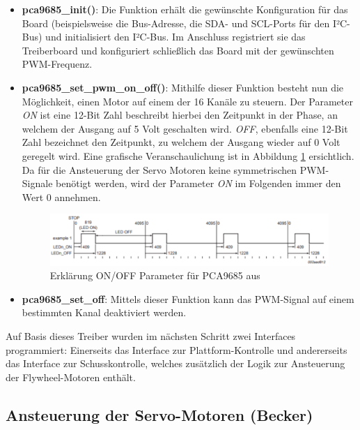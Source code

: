 \begin{itemize}
    \item \textbf{pca9685\_init()}: Die Funktion erhält die gewünschte Konfiguration für das Board (beispielsweise die Bus-Adresse, die SDA- und SCL-Ports für den I²C-Bus) und initialisiert den I²C-Bus. 
    Im Anschluss registriert sie das Treiberboard und konfiguriert schließlich das Board mit der gewünschten PWM-Frequenz.
    \item \textbf{pca9685\_set\_pwm\_on\_off()}: Mithilfe dieser Funktion besteht nun die Möglichkeit, einen Motor auf einem der 16 Kanäle zu steuern. 
    Der Parameter \textit{ON} ist eine 12-Bit Zahl beschreibt hierbei den Zeitpunkt in der Phase, an welchem der Ausgang auf 5 Volt geschalten wird. 
    \textit{OFF}, ebenfalls eine 12-Bit Zahl bezeichnet den Zeitpunkt, zu welchem der Ausgang wieder auf 0 Volt geregelt wird. 
    Eine grafische Veranschaulichung ist in Abbildung \ref{fig:esp_pca9685_on_off} ersichtlich. 
    Da für die Ansteuerung der Servo Motoren keine symmetrischen PWM-Signale benötigt werden, wird der Parameter \textit{ON} im Folgenden immer den Wert 0 annehmen.

    \begin{figure}[ht]
        \centering
        \includegraphics[width=\textwidth]{images/becker_esp_pca9685.png}
        \caption{Erklärung ON\slash OFF Parameter für PCA9685 aus \cite[S.~17]{esp_pca9685_datasheet}}
        \label{fig:esp_pca9685_on_off}
    \end{figure}

    \item \textbf{pca9685\_set\_off}: Mittels dieser Funktion kann das PWM-Signal auf einem bestimmten Kanal deaktiviert werden.
\end{itemize}

Auf Basis dieses Treiber wurden im nächsten Schritt zwei Interfaces programmiert: 
Einerseits das Interface zur Plattform-Kontrolle und andererseits das Interface zur Schusskontrolle, welches zusätzlich der Logik zur Ansteuerung der Flywheel-Motoren enthält.

\subsection{Ansteuerung der Servo-Motoren (Becker)}

